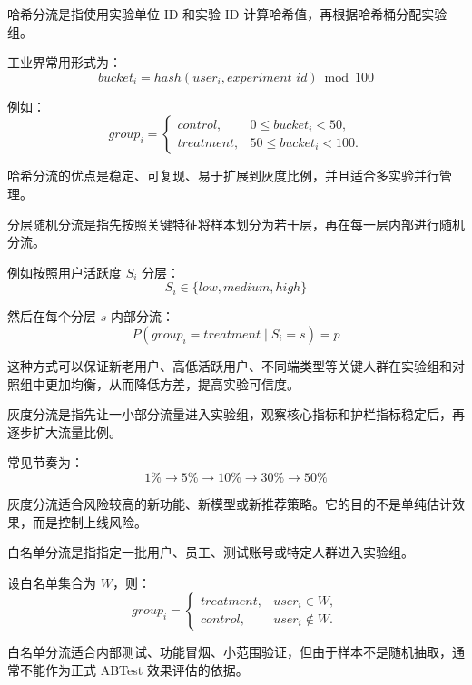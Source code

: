 \begin{theorem}[哈希分流]
哈希分流是指使用实验单位 ID 和实验 ID 计算哈希值，再根据哈希桶分配实验组。

工业界常用形式为：
\[
bucket_i = hash(user_i, experiment\_id) \bmod 100
\]

例如：
\[
group_i =
\begin{cases}
control, & 0 \leq bucket_i < 50, \\
treatment, & 50 \leq bucket_i < 100.
\end{cases}
\]

哈希分流的优点是稳定、可复现、易于扩展到灰度比例，并且适合多实验并行管理。
\end{theorem}

\begin{theorem}[分层随机分流]
分层随机分流是指先按照关键特征将样本划分为若干层，再在每一层内部进行随机分流。

例如按照用户活跃度 $S_i$ 分层：
\[
S_i \in \{low, medium, high\}
\]

然后在每个分层 $s$ 内部分流：
\[
P(group_i = treatment \mid S_i = s) = p
\]

这种方式可以保证新老用户、高低活跃用户、不同端类型等关键人群在实验组和对照组中更加均衡，从而降低方差，提高实验可信度。
\end{theorem}

\begin{theorem}[灰度分流]
灰度分流是指先让一小部分流量进入实验组，观察核心指标和护栏指标稳定后，再逐步扩大流量比例。

常见节奏为：
\[
1\% \rightarrow 5\% \rightarrow 10\% \rightarrow 30\% \rightarrow 50\%
\]

灰度分流适合风险较高的新功能、新模型或新推荐策略。它的目的不是单纯估计效果，而是控制上线风险。
\end{theorem}

\begin{theorem}[白名单分流]
白名单分流是指指定一批用户、员工、测试账号或特定人群进入实验组。

设白名单集合为 $W$，则：
\[
group_i =
\begin{cases}
treatment, & user_i \in W, \\
control, & user_i \notin W.
\end{cases}
\]

白名单分流适合内部测试、功能冒烟、小范围验证，但由于样本不是随机抽取，通常不能作为正式 ABTest 效果评估的依据。
\end{theorem}






